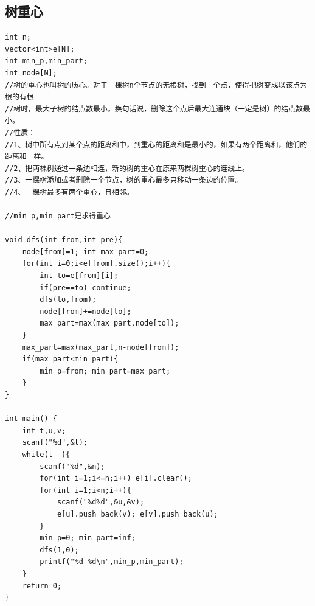 \documentclass[twoside]{article}
\begin{document}
\subsection{树重心}
\begin{lstlisting}
int n;
vector<int>e[N];
int min_p,min_part;
int node[N];
//树的重心也叫树的质心。对于一棵树n个节点的无根树，找到一个点，使得把树变成以该点为根的有根
//树时，最大子树的结点数最小。换句话说，删除这个点后最大连通块（一定是树）的结点数最小。
//性质：
//1、树中所有点到某个点的距离和中，到重心的距离和是最小的，如果有两个距离和，他们的距离和一样。
//2、把两棵树通过一条边相连，新的树的重心在原来两棵树重心的连线上。
//3、一棵树添加或者删除一个节点，树的重心最多只移动一条边的位置。
//4、一棵树最多有两个重心，且相邻。

//min_p,min_part是求得重心

void dfs(int from,int pre){
    node[from]=1; int max_part=0;
    for(int i=0;i<e[from].size();i++){
        int to=e[from][i];
        if(pre==to) continue;
        dfs(to,from);
        node[from]+=node[to];
        max_part=max(max_part,node[to]);
    }
    max_part=max(max_part,n-node[from]);
    if(max_part<min_part){
        min_p=from; min_part=max_part;
    }
}

int main() {
    int t,u,v;
    scanf("%d",&t);
    while(t--){
        scanf("%d",&n);
        for(int i=1;i<=n;i++) e[i].clear();
        for(int i=1;i<n;i++){
            scanf("%d%d",&u,&v);
            e[u].push_back(v); e[v].push_back(u);
        }
        min_p=0; min_part=inf;
        dfs(1,0);
        printf("%d %d\n",min_p,min_part);
    }
    return 0;
}\end{lstlisting}
\end{document}
